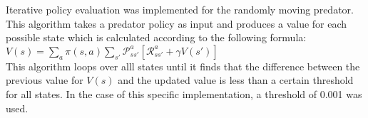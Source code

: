 Iterative policy evaluation was implemented for the randomly moving predator. This algorithm takes a predator policy as input and produces a value for each possible state which is calculated according to the following formula: \\

\begin{math}
  V(s) = \sum_a \pi (s, a) \sum_{s'} \mathcal{P}_{ss'}^a \left[\mathcal{R}_{ss'}^a + \gamma V(s') \right]
\end{math} \\

This algorithm loops over alll states until it finds that the difference between the previous value for $V(s)$ and the updated value is less than a certain threshold for all states. In the case of this specific implementation, a threshold of 0.001 was used.